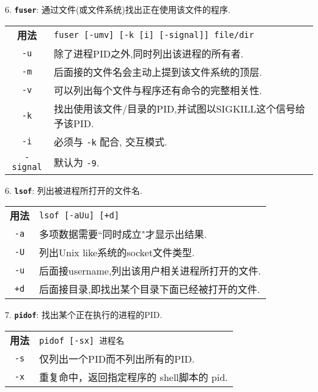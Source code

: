 \par
6. \textbf{\texttt{fuser}}: 通过文件(或文件系统)找出正在使用该文件的程序.
\begin{longtable}{c@{ : }p{}}\hline\hline

    \textbf{用法} & \verb"fuser [-umv] [-k [i] [-signal]] file/dir"\\

    \texttt{-u} & 除了进程PID之外,同时列出该进程的所有者. \\

    \texttt{-m} & 后面接的文件名会主动上提到该文件系统的顶层.\\

    \texttt{-v} & 可以列出每个文件与程序还有命令的完整相关性. \\

    \texttt{-k} & 找出使用该文件/目录的PID,并试图以SIGKILL这个信号给予该PID. \\

    \texttt{-i} & 必须与 \texttt{-k} 配合, 交互模式. \\

    \texttt{-signal} & 默认为 \texttt{-9}. \\

    \hline
\end{longtable}

\par
6. \textbf{\texttt{lsof}}: 列出被进程所打开的文件名.
\begin{longtable}{c@{ : }p{}}\hline\hline

    \textbf{用法} & \verb"lsof [-aUu] [+d]"\\

    \texttt{-a} & 多项数据需要``同时成立"才显示出结果. \\

    \texttt{-U} & 列出Unix like系统的socket文件类型.\\

    \texttt{-u} & 后面接username,列出该用户相关进程所打开的文件. \\

    \texttt{+d} & 后面接目录,即找出某个目录下面已经被打开的文件. \\

    \hline
\end{longtable}

\par
7. \textbf{\texttt{pidof}}: 找出某个正在执行的进程的PID.
\begin{longtable}{c@{ : }p{}}\hline\hline

    \textbf{用法} & \verb"pidof [-sx] 进程名"\\

    \texttt{-s} & 仅列出一个PID而不列出所有的PID. \\

    \texttt{-x} & 重复命中，返回指定程序的 shell脚本的 pid.\\

    \hline
\end{longtable}
